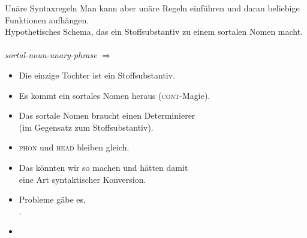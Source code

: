 \begin{frame}
  {Unäre Syntaxregeln}
  \onslide<+->
  \onslide<+->
  Man kann aber \alert{unäre Regeln} einführen und daran beliebige Funktionen aufhängen.\\
  Hypothetisches Schema, das ein Stoffsubstantiv zu einem sortalen Nomen macht.\\
  \\
  \onslide<+->
  \Zeile
  \textit{sortal-noun-unary-phrase} $\Rightarrow$\\
  \Viertelzeile
  \begin{minipage}{0.425\textwidth}
  \end{minipage}%
  \begin{minipage}{0.55\textwidth}
    \begin{itemize}[<+->]\footnotesize
      \item Die einzige Tochter ist ein Stoffsubstantiv.
      \item Es kommt ein sortales Nomen heraus (\textsc{cont}-Magie).
      \item Das sortale Nomen braucht einen Determinierer\\
        (im Gegensatz zum Stoffsubstantiv).
      \item \textsc{phon} und \textsc{head} bleiben gleich.
        \Halbzeile
      \item Das könnten wir so machen und hätten damit\\
        eine Art \alert{syntaktischer Konversion}.
      \item Probleme gäbe es, \\
        .
      \item {}
    \end{itemize}
  \end{minipage}
\end{frame}

